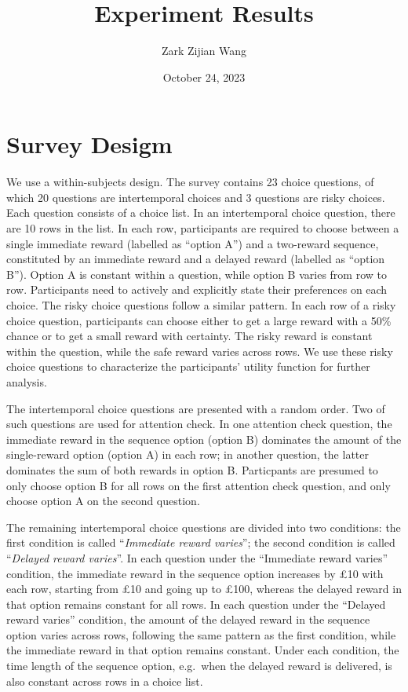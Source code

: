 \documentclass[
  12pt,
]{article}
\title{Experiment Results}
\author{Zark Zijian Wang}
\date{October 24, 2023}
\begin{document}
\maketitle

\hypertarget{survey-desigm}{%
\section{Survey Desigm}\label{survey-desigm}}

We use a within-subjects design. The survey contains 23 choice
questions, of which 20 questions are intertemporal choices and 3
questions are risky choices. Each question consists of a choice list. In
an intertemporal choice question, there are 10 rows in the list. In each
row, participants are required to choose between a single immediate
reward (labelled as ``option A'') and a two-reward sequence, constituted
by an immediate reward and a delayed reward (labelled as ``option B'').
Option A is constant within a question, while option B varies from row
to row. Participants need to actively and explicitly state their
preferences on each choice. The risky choice questions follow a similar
pattern. In each row of a risky choice question, participants can choose
either to get a large reward with a 50\% chance or to get a small reward
with certainty. The risky reward is constant within the question, while
the safe reward varies across rows. We use these risky choice questions
to characterize the participants' utility function for further analysis.

The intertemporal choice questions are presented with a random order.
Two of such questions are used for attention check. In one attention
check question, the immediate reward in the sequence option (option B)
dominates the amount of the single-reward option (option A) in each row;
in another question, the latter dominates the sum of both rewards in
option B. Particpants are presumed to only choose option B for all rows
on the first attention check question, and only choose option A on the
second question.

The remaining intertemporal choice questions are divided into two
conditions: the first condition is called ``\emph{Immediate reward
varies}''; the second condition is called ``\emph{Delayed reward
varies}''. In each question under the ``Immediate reward varies''
condition, the immediate reward in the sequence option increases by £10
with each row, starting from £10 and going up to £100, whereas the
delayed reward in that option remains constant for all rows. In each
question under the ``Delayed reward varies'' condition, the amount of
the delayed reward in the sequence option varies across rows, following
the same pattern as the first condition, while the immediate reward in
that option remains constant. Under each condition, the time length of
the sequence option, e.g.~when the delayed reward is delivered, is also
constant across rows in a choice list.
\end{document}
